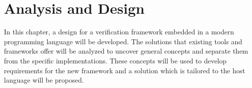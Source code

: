 \chapter{Analysis and Design} %

In this chapter, a design for a verification framework embedded in a modern programming language will be developed.
The solutions that existing tools and frameworks offer will be analyzed to uncover general concepts and separate them
from the specific implementations. These concepts will be used to develop requirements for the new framework and a
solution which is tailored to the host language will be proposed.


